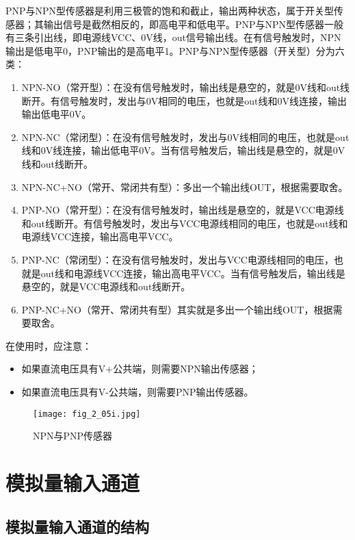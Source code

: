 \begin{remark}
PNP与NPN型传感器是利用三极管的饱和和截止，输出两种状态，属于开关型传感器；其输出信号是截然相反的，即高电平和低电平。PNP与NPN型传感器一般有三条引出线，即电源线VCC、0V线，out信号输出线。在有信号触发时，NPN输出是低电平0，PNP输出的是高电平1。PNP与NPN型传感器（开关型）分为六类：
\begin{enumerate}
  \item
NPN-NO（常开型）：在没有信号触发时，输出线是悬空的，就是0V线和out线断开。有信号触发时，发出与0V相同的电压，也就是out线和0V线连接，输出输出低电平0V。
  \item
NPN-NC（常闭型）：在没有信号触发时，发出与0V线相同的电压，也就是out线和0V线连接，输出低电平0V。当有信号触发后，输出线是悬空的，就是0V线和out线断开。
  \item
NPN-NC+NO（常开、常闭共有型）：多出一个输出线OUT，根据需要取舍。
  \item
PNP-NO（常开型）：在没有信号触发时，输出线是悬空的，就是VCC电源线和out线断开。有信号触发时，发出与VCC电源线相同的电压，也就是out线和电源线VCC连接，输出高电平VCC。
  \item
PNP-NC（常闭型）：在没有信号触发时，发出与VCC电源线相同的电压，也就是out线和电源线VCC连接，输出高电平VCC。当有信号触发后，输出线是悬空的，就是VCC电源线和out线断开。
  \item
PNP-NC+NO（常开、常闭共有型）其实就是多出一个输出线OUT，根据需要取舍。
\end{enumerate}

在使用时，应注意：

\begin{itemize}
  \item 如果直流电压具有V+公共端，则需要NPN输出传感器；
  \item 如果直流电压具有V-公共端，则需要PNP输出传感器。
\end{itemize}

\end{remark}

\begin{figure}[h]
  \centering
  \texttt{[image: fig\_2\_05i.jpg]}
  \caption{NPN与PNP传感器}\label{fig_2_05i}
\end{figure}

\section{模拟量输入通道}

\subsection{模拟量输入通道的结构}

